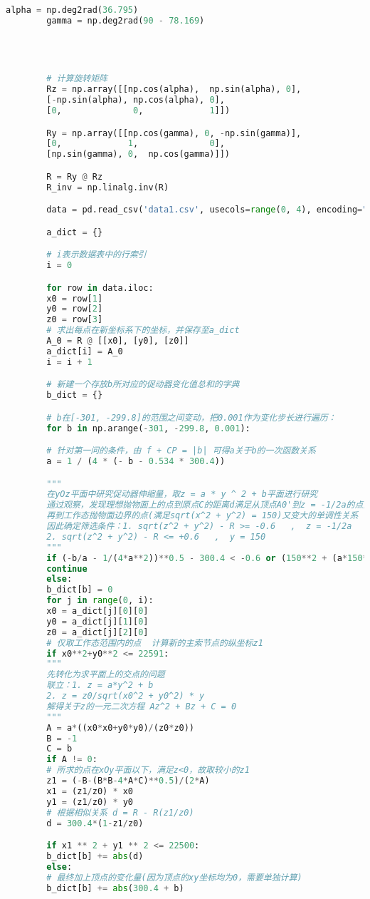 \documentclass{cumcmthesis}
\begin{document}
\begin{appendices}
\begin{lstlisting}[language={python}]
		alpha = np.deg2rad(36.795)
		gamma = np.deg2rad(90 - 78.169)




		# 计算旋转矩阵
		Rz = np.array([[np.cos(alpha),  np.sin(alpha), 0],
		[-np.sin(alpha), np.cos(alpha), 0],
		[0,              0,             1]])

		Ry = np.array([[np.cos(gamma), 0, -np.sin(gamma)],
		[0,             1,              0],
		[np.sin(gamma), 0,  np.cos(gamma)]])

		R = Ry @ Rz
		R_inv = np.linalg.inv(R)

		data = pd.read_csv('data1.csv', usecols=range(0, 4), encoding="gbk")

		a_dict = {}

		# i表示数据表中的行索引
		i = 0

		for row in data.iloc:
		x0 = row[1]
		y0 = row[2]
		z0 = row[3]
		# 求出每点在新坐标系下的坐标，并保存至a_dict
		A_0 = R @ [[x0], [y0], [z0]]
		a_dict[i] = A_0
		i = i + 1

		# 新建一个存放b所对应的促动器变化值总和的字典
		b_dict = {}

		# b在[-301, -299.8]的范围之间变动，把0.001作为变化步长进行遍历：
		for b in np.arange(-301, -299.8, 0.001):

		# 针对第一问的条件，由 f + CP = |b| 可得a关于b的一次函数关系
		a = 1 / (4 * (- b - 0.534 * 300.4))

		"""
		在yOz平面中研究促动器伸缩量，取z = a * y ^ 2 + b平面进行研究
		通过观察，发现理想抛物面上的点到原点C的距离d满足从顶点A0'到z = -1/2a的点先变小，
		再到工作态抛物面边界的点(满足sqrt(x^2 + y^2) = 150)又变大的单调性关系
		因此确定筛选条件：1. sqrt(z^2 + y^2) - R >= -0.6   ,  z = -1/2a
		2. sqrt(z^2 + y^2) - R <= +0.6   ,  y = 150
		"""
		if (-b/a - 1/(4*a**2))**0.5 - 300.4 < -0.6 or (150**2 + (a*150**2+b)**2)**0.5 - 300.4 > 0.6:
		continue
		else:
		b_dict[b] = 0
		for j in range(0, i):
		x0 = a_dict[j][0][0]
		y0 = a_dict[j][1][0]
		z0 = a_dict[j][2][0]
		# 仅取工作态范围内的点  计算新的主索节点的纵坐标z1
		if x0**2+y0**2 <= 22591:
		"""
		先转化为求平面上的交点的问题
		联立：1. z = a*y^2 + b
		2. z = z0/sqrt(x0^2 + y0^2) * y
		解得关于z的一元二次方程 Az^2 + Bz + C = 0
		"""
		A = a*((x0*x0+y0*y0)/(z0*z0))
		B = -1
		C = b
		if A != 0:
		# 所求的点在xOy平面以下，满足z<0，故取较小的z1
		z1 = (-B-(B*B-4*A*C)**0.5)/(2*A)
		x1 = (z1/z0) * x0
		y1 = (z1/z0) * y0
		# 根据相似关系 d = R - R(z1/z0)
		d = 300.4*(1-z1/z0)

		if x1 ** 2 + y1 ** 2 <= 22500:
		b_dict[b] += abs(d)
		else:
		# 最终加上顶点的变化量(因为顶点的xy坐标均为0，需要单独计算)
		b_dict[b] += abs(300.4 + b)


\end{lstlisting}
\end{appendices}
\end{document}
